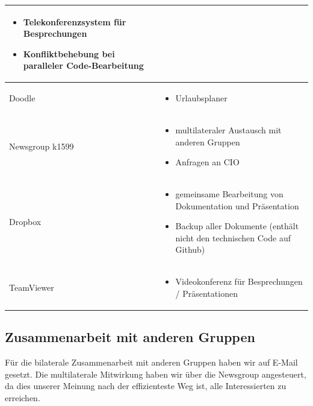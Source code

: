 \begin{minipage}{\textwidth}
\begin{center}
\begin{tabular}{lp{12cm}}
\begin{minipage}[t]{1\textwidth}
\begin{itemize}
    \item Telekonferenzsystem für Besprechungen
    \item Konfliktbehebung bei paralleler Code-Bearbeitung
    \end{itemize}
  \end{minipage}\\
  \midrule
Doodle &
  \begin{minipage}[t]{1\textwidth}
    \begin{itemize}
    \item Urlaubsplaner
    \end{itemize}
  \end{minipage}\\
  \midrule
Newsgroup k1599 &
  \begin{minipage}[t]{1\textwidth}
    \begin{itemize}
    \item multilateraler Austausch mit anderen Gruppen
    \item Anfragen an CIO
    \end{itemize}
  \end{minipage}\\
  \midrule
Dropbox &
  \begin{minipage}[t]{1\textwidth}
    \begin{itemize}
    \item gemeinsame Bearbeitung von Dokumentation \newline und Präsentation
    \item Backup aller Dokumente \newline(enthält nicht den technischen Code auf Github)
    \end{itemize}
  \end{minipage}\\
  \midrule
TeamViewer &
  \begin{minipage}[t]{1\textwidth}
    \begin{itemize}
    \item Videokonferenz für Besprechungen / Präsentationen
    \end{itemize}
  \end{minipage}\\
\bottomrule
\end{tabular}
\end{center}
\end{minipage}

\subsection{Zusammenarbeit mit anderen Gruppen}
Für die bilaterale Zusammenarbeit mit anderen Gruppen haben wir auf E-Mail gesetzt. Die multilaterale Mitwirkung haben wir über die Newsgroup angesteuert, da dies unserer Meinung nach der effizienteste Weg ist, alle Interessierten zu erreichen.

